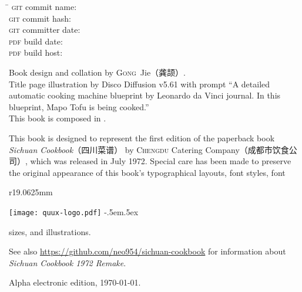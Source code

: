 \endgroup

\vfill

\setlength{\parskip}{.3125\baselineskip}%
\vspace{-2\baselineskip}
\begin{tabbing}
\hspace{9.5625em}\= \kill
\textsc{git} commit name:       \>\texttt{\gitcommitname}\\
\textsc{git} commit hash:       \>\texttt{\gitcommithash}\\
\textsc{git} committer date:    \>\texttt{\gitcommitterdate}\\
\textsc{pdf} build date:        \>\texttt{\pdfbuilddate}\\
\textsc{pdf} build host:        \>\texttt{\pdfbuildhost}
\end{tabbing}
\vspace{-1\baselineskip}

Book design and collation by \textsc{Gong}~Jie\!（龚颉）\!\!\!.\\
Title page illustration by Disco Diffusion v5.61 with prompt ``A detailed
automatic cooking machine blueprint by Leonardo da Vinci journal. In this
blueprint, Mapo Tofu is being cooked.''\\
This book is composed in \XeLaTeX.

This book is designed to represent the first edition of the paperback book
\textit{Sichuan Cookbook}{\kafamily（四川菜谱）}\!\!\! by \textsc{Chengdu}
Catering Company\!（成都市饮食公司）\!\!\!, which was released in July 1972.
Special care has been made to preserve the original appearance of this book's
typographical layouts, font styles, font
\begin{wrapfigure}{r}{19.0625mm}%
\vspace{-1.25\baselineskip}%
\begin{flushright}%
\quad\texttt{[image: quux-logo.pdf]}%
{\sffamily\tiny\kern-.5em\lower.5ex\hbox{\texttrademark}}%
\end{flushright}%
\vspace{-1.75\baselineskip}%
\end{wrapfigure}%
sizes, and illustrations.

See also \url{https://github.com/neo954/sichuan-cookbook} for information
about \textit{Sichuan Cookbook 1972 Remake}.

Alpha electronic edition, \today.

\endgroup%


